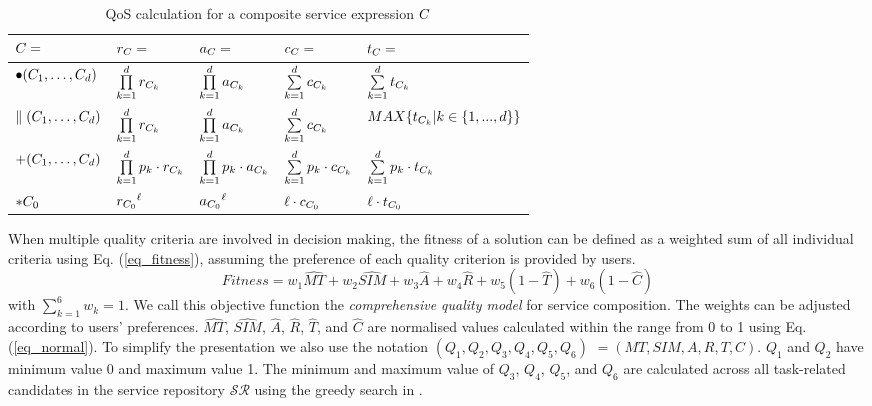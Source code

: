 \begin{table}[htb]
\centering
\caption{QoS calculation for a composite service expression $C$}
\begin{tabular}{l|l|l|l|l}
\hline
 $C=$       &$r_C=$                              &$a_C=$                              &$c_C=$                            &$t_C=$ \\ \hline
 $\bullet(C_1,\ldots,C_d)$      &$\prod\limits^d_{k=1}r_{C_k}$    &$\prod\limits^d_{k=1}a_{C_k}$    &$\sum\limits^d_{k=1}c_{C_k}$   &$\sum\limits^d_{k=1}t_{C_k}$  \\ \hline
 $\parallel(C_1,\ldots,C_d)$  &$\prod\limits^d_{k=1}r_{C_k}$    &$\prod\limits^d_{k=1}a_{C_k}$    &$\sum\limits^d_{k=1}c_{C_k}$   &$MAX \{ t_{C_k} | k \in \{ 1,...,d \} \}$\\ \hline
 $+(C_1,\ldots,C_d)$     &$\prod\limits^d_{k=1}p_k\cdot r_{C_k}$    &$\prod\limits^d_{k=1}p_k\cdot a_{C_k}$    &$\sum\limits^d_{k=1}p_k\cdot c_{C_k}$   &$\sum\limits^d_{k=1}p_k\cdot t_{C_k}$  \\ \hline
 $\ast C_0$         &${r_{C_0}}^\ell$  &${a_{C_0}}^\ell$  &$\ell\cdot c_{C_0}$ &$\ell\cdot t_{C_0}$ \\ \hline
\end{tabular}
\label{tbl:QoS_Aggre}
\end{table}

When multiple quality criteria are involved in decision making, the fitness of a solution can be defined as a weighted sum of all individual criteria using Eq. (\ref{eq_fitness}), assuming the preference of each quality criterion is provided by users.
\begin{equation}
\label{eq_fitness}
Fitness = w_1 \hat{MT} + w_2 \hat{SIM} + w_3 \hat{A} + w_4 \hat{R} + w_5(1 - \hat{T}) + w_6(1 - \hat{C})
\end{equation}
\noindent with $\sum_{k=1}^{6} w_k= 1$. We call this objective function the \emph{comprehensive quality model} for service composition.
The weights can be adjusted according to users' preferences. $\hat{MT}$, $\hat{SIM}$, $\hat{A}$, $\hat{R}$, $\hat{T}$, and $\hat{C}$ are normalised values calculated within the range from 0 to 1 using Eq. (\ref{eq_normal}). To simplify the presentation we also use the notation $(Q_1,Q_2,Q_3,Q_4,Q_5,Q_6) $ $= (MT,SIM,A,R,T,C)$. $Q_1$ and $Q_2$ have minimum value 0 and maximum value 1. The minimum and maximum value of $Q_3$, $Q_4$, $Q_5$, and $Q_6$ are calculated across all task-related candidates in the service repository $\mathcal{SR}$ using the greedy search in \cite{ma2015hybrid,da2016genetic}.


